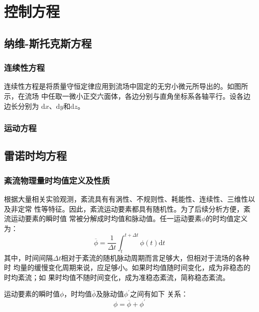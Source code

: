 \chapter{控制方程}
\section{纳维-斯托克斯方程}
\subsection{连续性方程}
连续性方程是将质量守恒定律应用到流场中固定的无穷小微元所导出的。如图所示，在流场
中任取一微小正交六面体，各边分别与直角坐标系各轴平行。设各边边长分别为
$\mathrm{d}x$、$\mathrm{d}y$和$\mathrm{d}z$。




\subsection{运动方程}

\section{雷诺时均方程}
\subsection{紊流物理量时均值定义及性质}
根据大量相关实验观测，紊流具有有涡性、不规则性、耗能性、连续性、三维性以及非定常
性等特征。因此，紊流运动要素都具有随机性。为了后续分析方便，紊流运动要素的瞬时值
常被分解成时均值和脉动值。任一运动要素$\phi$的时均值定义为：
\begin{equation}
  \overline{\phi}
  =
  \frac{1}{\Delta t}
  \int_{t}^{t+\Delta t}\!
  \phi(t)
  \mathrm{d}t
  \label{EqCGe_RA}
\end{equation}
其中，时间间隔$\Delta t$相对于紊流的随机脉动周期而言足够大，但相对于流场的各种时
均量的缓慢变化周期来说，应足够小。如果时均值随时间变化，成为非稳态的时均紊流；如
果时均值不随时间变化，成为准稳态紊流，简称稳态紊流。

运动要素的瞬时值$\phi$，时均值$\overline{\phi}$及脉动值$\phi^{\prime}$之间有如下
关系：
\begin{equation}
  \phi = \overline{\phi} + \phi^{\prime}
  \label{EqCGe_RA_Comp}
\end{equation}

